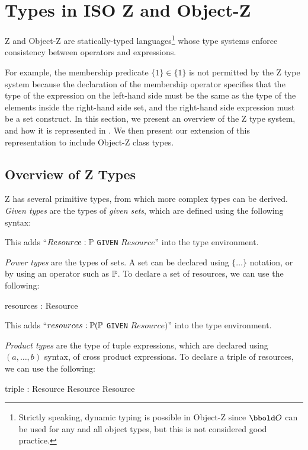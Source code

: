 \section{Types in ISO Z and Object-Z}

Z and Object-Z are statically-typed languages\footnote{Strictly
speaking, dynamic typing is possible in Object-Z since $\oid$ can be
used for any and all object types, but this is not considered good
practice.} whose type systems enforce consistency between operators
and expressions.

For example, the membership predicate $\{1\} \in \{1\}$ is not
permitted by the Z type system because the declaration of the
membership operator specifies that the type of the expression on the
left-hand side must be the same as the type of the elements inside the
right-hand side set, and the right-hand side expression must be a set
construct.  In this section, we present an overview of the Z type
system, and how it is represented in \theStandard. We then present
our extension of this representation to include Object-Z class types.

\subsection{Overview of Z Types}

Z has several primitive types, from which more complex types can be
derived. {\em Given types} are the types of {\em given sets}, which are
defined using the following syntax:
\begin{zed}
  [Resource]
\end{zed}

This adds ``$Resource : \power$ {\tt GIVEN} $Resource$'' into the type
environment.

{\em Power types} are the types of sets. A set can be declared using
$\{\ldots\}$ notation, or by using an operator such as $\power$. To
declare a set of resources, we can use the following:
\begin{axdef}
  resources : \power Resource
\end{axdef}

This adds ``$resources : \power (\power$ {\tt GIVEN}
$Resource)$'' into the type environment.

{\em Product types} are the type of tuple expressions, which are
declared using $(a, \ldots, b)$ syntax, of cross product expressions. To
declare a triple of resources, we can use the following:
\begin{axdef}
   triple : Resource \cross Resource \cross Resource
\end{axdef}

